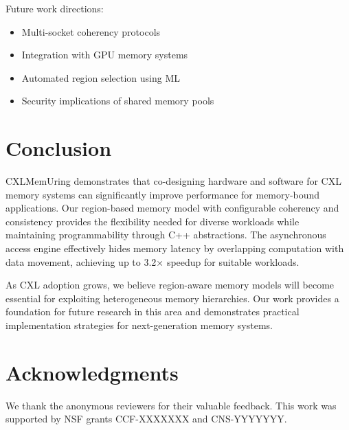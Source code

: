 \documentclass[10pt,conference]{IEEEtran}
\begin{document}
Future work directions:
\begin{itemize}
    \item Multi-socket coherency protocols
    \item Integration with GPU memory systems
    \item Automated region selection using ML
    \item Security implications of shared memory pools
\end{itemize}

\section{Conclusion}

CXLMemUring demonstrates that co-designing hardware and software for CXL memory systems can significantly improve performance for memory-bound applications. Our region-based memory model with configurable coherency and consistency provides the flexibility needed for diverse workloads while maintaining programmability through C++ abstractions. The asynchronous access engine effectively hides memory latency by overlapping computation with data movement, achieving up to 3.2× speedup for suitable workloads.

As CXL adoption grows, we believe region-aware memory models will become essential for exploiting heterogeneous memory hierarchies. Our work provides a foundation for future research in this area and demonstrates practical implementation strategies for next-generation memory systems.

\section*{Acknowledgments}

We thank the anonymous reviewers for their valuable feedback. This work was supported by NSF grants CCF-XXXXXXX and CNS-YYYYYYY.



\end{document}
